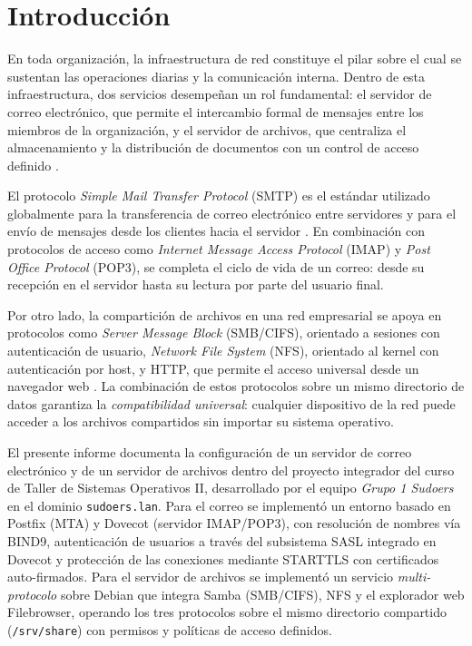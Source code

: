 
\section{Introducción}

En toda organización, la infraestructura de red constituye el pilar sobre el
cual se sustentan las operaciones diarias y la comunicación interna. Dentro de
esta infraestructura, dos servicios desempeñan un rol fundamental: el
servidor de correo electrónico, que permite el intercambio formal de
mensajes entre los miembros de la organización, y el servidor de
archivos, que centraliza el almacenamiento y la distribución de documentos
con un control de acceso definido \cite{stewart2017}.

El protocolo \textit{Simple Mail Transfer Protocol} (SMTP) es el estándar
utilizado globalmente para la transferencia de correo electrónico entre
servidores y para el envío de mensajes desde los clientes hacia el
servidor \cite{postel1982}. En combinación con protocolos de acceso como
\textit{Internet Message Access Protocol} (IMAP) y \textit{Post Office
Protocol} (POP3), se completa el ciclo de vida de un correo: desde su
recepción en el servidor hasta su lectura por parte del usuario final.

Por otro lado, la compartición de archivos en una red empresarial se apoya en
protocolos como \textit{Server Message Block} (SMB/CIFS), orientado a sesiones
con autenticación de usuario, \textit{Network File System} (NFS), orientado al
kernel con autenticación por host, y HTTP, que permite el acceso universal
desde un navegador web \cite{tanenbaum2017}. La combinación de
estos protocolos sobre un mismo directorio de datos garantiza la
\emph{compatibilidad universal}: cualquier dispositivo de la red puede acceder
a los archivos compartidos sin importar su sistema operativo.

El presente informe documenta la configuración de un servidor de correo
electrónico y de un servidor de archivos dentro del proyecto integrador del
curso de Taller de Sistemas Operativos II, desarrollado por el equipo
\textit{Grupo 1 Sudoers} en el dominio \texttt{sudoers.lan}. Para el correo se
implementó un entorno basado en Postfix (MTA) y Dovecot (servidor IMAP/POP3),
con resolución de nombres vía BIND9, autenticación de usuarios a través del
subsistema SASL integrado en Dovecot y protección de las conexiones mediante
STARTTLS con certificados auto-firmados. Para el servidor de archivos se
implementó un servicio \emph{multi-protocolo} sobre Debian que integra Samba
(SMB/CIFS), NFS y el explorador web Filebrowser, operando los tres protocolos
sobre el mismo directorio compartido (\texttt{/srv/share}) con permisos y
políticas de acceso definidos.

